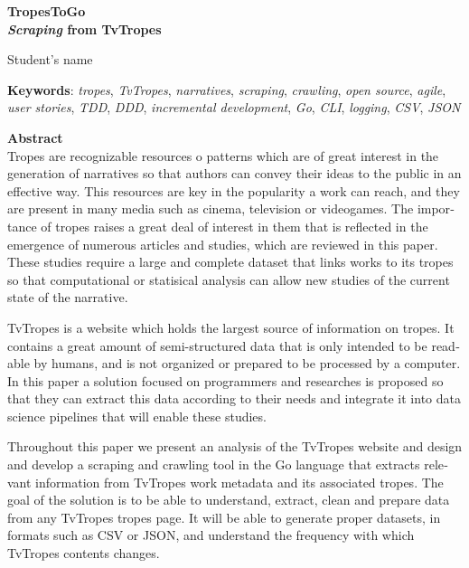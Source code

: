 \begin{otherlanguage}{english}

\begin{center}
    {\large\bfseries TropesToGo \\ \textit{Scraping} from TvTropes}\\
\end{center}
\begin{center}
    Student's name\\
\end{center}
\vspace{0.5cm}
\noindent\textbf{Keywords}: \textit{tropes}, \textit{TvTropes},
\textit{narratives}, \textit{scraping}, \textit{crawling}, \textit{open source},
\textit{agile}, \textit{user stories}, \textit{TDD}, \textit{DDD},
\textit{incremental development}, \textit{Go}, \textit{CLI}, \textit{logging},
\textit{CSV},
\textit{JSON}
\vspace{0.7cm}

\noindent\textbf{Abstract}\\

Tropes are recognizable resources o patterns which are of great interest in the
generation of narratives so that authors can convey their ideas to the public in
an effective way. This resources are key in the popularity a work can reach, and
they are present in many media such as cinema, television or videogames. The
importance of tropes raises a great deal of interest in them that is reflected
in the emergence of numerous articles and studies, which are reviewed in this
paper. These studies require a large and complete dataset that links works to
its tropes so that computational or statisical analysis can allow new studies of
the current state of the narrative.

TvTropes is a website which holds the largest source of information on tropes.
It contains a great amount of semi-structured data that is only intended to be
readable by humans, and is not organized or prepared to be processed by a
computer. In this paper a solution focused on programmers and researches is
proposed so that they can extract this data according to their needs and
integrate it into data science pipelines that will enable these studies.

Throughout this paper we present an analysis of the TvTropes website and design
and develop a scraping and crawling tool in the Go language that extracts
relevant information from TvTropes work metadata and its associated tropes. The
goal of the solution is to be able to understand, extract, clean and prepare
data from any TvTropes tropes page. It will be able to generate proper datasets,
in formats such as CSV or JSON, and understand the frequency with which TvTropes
contents changes.


\end{otherlanguage}

